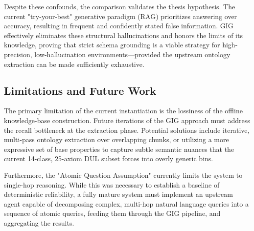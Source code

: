 Despite these confounds, the comparison validates the thesis hypothesis. The current "try-your-best" generative paradigm (RAG) prioritizes answering over accuracy, resulting in frequent and confidently stated false information. GIG effectively eliminates these structural hallucinations and honors the limits of its knowledge, proving that strict schema grounding is a viable strategy for high-precision, low-hallucination environments—provided the upstream ontology extraction can be made sufficiently exhaustive.

\subsection{Limitations and Future Work}
The primary limitation of the current instantiation is the lossiness of the offline knowledge-base construction. Future iterations of the GIG approach must address the recall bottleneck at the extraction phase. Potential solutions include iterative, multi-pass ontology extraction over overlapping chunks, or utilizing a more expressive set of base properties to capture subtle semantic nuances that the current 14-class, 25-axiom DUL subset forces into overly generic bins.

Furthermore, the "Atomic Question Assumption" currently limits the system to single-hop reasoning. While this was necessary to establish a baseline of deterministic reliability, a fully mature system must implement an upstream agent capable of decomposing complex, multi-hop natural language queries into a sequence of atomic queries, feeding them through the GIG pipeline, and aggregating the results.
